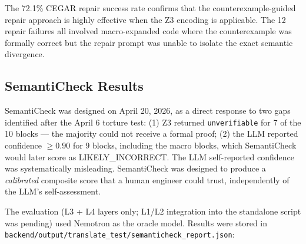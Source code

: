 The 72.1\% CEGAR repair success rate confirms that the counterexample-guided
repair approach is highly effective when the Z3 encoding is applicable.
The 12 repair failures all involved macro-expanded code where the counterexample
was formally correct but the repair prompt was unable to isolate the exact
semantic divergence.

\subsection{SemantiCheck Results}
\label{subsec:semanticheck-results}

SemantiCheck was designed on April 20, 2026, as a direct response to two
gaps identified after the April 6 torture test: (1) Z3 returned
\texttt{unverifiable} for 7 of the 10 blocks --- the majority could not receive
a formal proof; (2) the LLM reported confidence $\geq 0.90$ for 9 blocks,
including the macro blocks, which SemantiCheck would later score as
LIKELY\_INCORRECT. The LLM self-reported confidence was systematically
misleading. SemantiCheck was designed to produce a \emph{calibrated}
composite score that a human engineer could trust, independently of the LLM's
self-assessment.

The evaluation (L3 + L4 layers only; L1/L2 integration into the standalone
script was pending) used Nemotron as the oracle model. Results were stored in
\texttt{backend/output/translate\_test/semanticheck\_report.json}:

